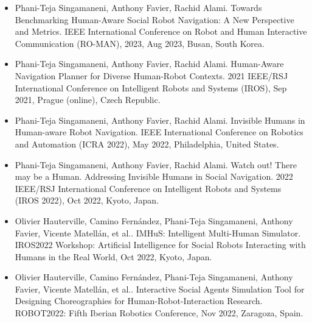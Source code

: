 \begin{itemize}
    \item Phani-Teja Singamaneni, Anthony Favier, Rachid Alami. Towards Benchmarking Human-Aware Social Robot Navigation: A New Perspective and Metrics. IEEE International Conference on Robot and Human Interactive Communication (RO-MAN), 2023, Aug 2023, Busan, South Korea.
    \item Phani-Teja Singamaneni, Anthony Favier, Rachid Alami. Human-Aware Navigation Planner for Diverse Human-Robot Contexts. 2021 IEEE/RSJ International Conference on Intelligent Robots and Systems (IROS), Sep 2021, Prague (online), Czech Republic. 
    \item Phani-Teja Singamaneni, Anthony Favier, Rachid Alami. Invisible Humans in Human-aware Robot Navigation. IEEE International Conference on Robotics and Automation (ICRA 2022), May 2022, Philadelphia, United States.
    \item Phani-Teja Singamaneni, Anthony Favier, Rachid Alami. Watch out! There may be a Human. Addressing Invisible Humans in Social Navigation. 2022 IEEE/RSJ International Conference on Intelligent Robots and Systems (IROS 2022), Oct 2022, Kyoto, Japan. 

    \item Olivier Hauterville, Camino Fernández, Phani-Teja Singamaneni, Anthony Favier, Vicente Matellán, et al.. IMHuS: Intelligent Multi-Human Simulator. IROS2022 Workshop: Artificial Intelligence for Social Robots Interacting with Humans in the Real World, Oct 2022, Kyoto, Japan. 
    \item Olivier Hauterville, Camino Fernández, Phani-Teja Singamaneni, Anthony Favier, Vicente Matellán, et al.. Interactive Social Agents Simulation Tool for Designing Choreographies for Human-Robot-Interaction Research. ROBOT2022: Fifth Iberian Robotics Conference, Nov 2022, Zaragoza, Spain. 
\end{itemize}
    
    
    